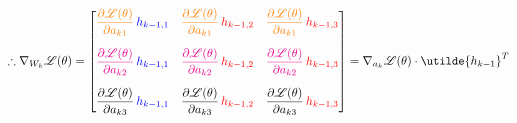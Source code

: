 \documentclass[11pt, a4paper]{article}
\begin{document}
\[
\therefore \nabla_{W_k} \mathscr{L}(\theta) =
\begin{bmatrix}
\textcolor{orange}{\dfrac{\partial \mathscr{L}(\theta)}{\partial a_{k1}}} \, \textcolor{blue}{h_{k-1,1}} &
\textcolor{orange}{\dfrac{\partial \mathscr{L}(\theta)}{\partial a_{k1}}} \, \textcolor{red}{h_{k-1,2}} &
\textcolor{orange}{\dfrac{\partial \mathscr{L}(\theta)}{\partial a_{k1}}} \, \textcolor{red}{h_{k-1,3}} \\[1.5em]

\textcolor{magenta}{\dfrac{\partial \mathscr{L}(\theta)}{\partial a_{k2}}} \, \textcolor{blue}{h_{k-1,1}} &
\textcolor{magenta}{\dfrac{\partial \mathscr{L}(\theta)}{\partial a_{k2}}} \, \textcolor{red}{h_{k-1,2}} &
\textcolor{magenta}{\dfrac{\partial \mathscr{L}(\theta)}{\partial a_{k2}}} \, \textcolor{red}{h_{k-1,3}} \\[1.5em]

\dfrac{\partial \mathscr{L}(\theta)}{\partial a_{k3}} \, \textcolor{blue}{h_{k-1,1}} &
\dfrac{\partial \mathscr{L}(\theta)}{\partial a_{k3}} \, \textcolor{red}{h_{k-1,2}} &
\dfrac{\partial \mathscr{L}(\theta)}{\partial a_{k3}} \, \textcolor{red}{h_{k-1,3}}
\end{bmatrix}
= \nabla_{a_k} \mathscr{L}(\theta) \cdot \utilde{h_{k-1}}^T
\]

\vspace{0.3cm}
\end{document}
